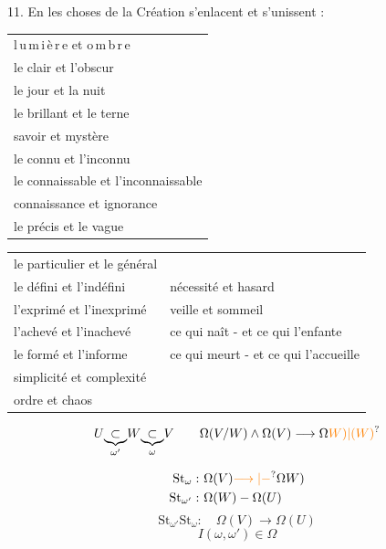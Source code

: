 11. En les choses de la Création s'enlacent et s'unissent :

\begin{tabular}{@{}l@{}}
l\,u\,m\,i\,è\,r\,e \quad et \quad o\,m\,b\,r\,e\\
le clair \quad et l'obscur\\
le jour \quad et la nuit\\
le brillant \quad et le terne\\[.6ex]
savoir \quad et mystère\\
le connu \quad et l'inconnu\\
le connaissable \quad et l'inconnaissable\\
connaissance \quad et ignorance\\[.6ex]
le précis \quad et le vague
\end{tabular}

\begin{tabular}{@{}p{.48\linewidth}@{\quad}p{.43\linewidth}@{}}
le particulier \quad et le général & \\
le défini \quad et l'indéfini & \makebox[0pt][r]{\smash{\begin{tikzpicture}[x=1em,y=1ex,baseline=0pt]\draw (-1.0,-11)--(.45,2.1);\end{tikzpicture}}\hspace{.35em}}nécessité \quad et hasard\\
l'exprimé \quad et l'inexprimé & veille \quad et sommeil\\[.6ex]
l'achevé \quad et l'inachevé & ce qui naît - et ce qui l'enfante\\
le formé \quad et l'informe & ce qui meurt - et ce qui l'accueille\\
simplicité \quad et complexité &\\
ordre \quad et chaos &
\end{tabular}

\[
U\underset{\omega'}{\underbrace{\subset}}W\underset{\omega}{\underbrace{\subset}}V
\qquad
\Omega(V/W)\wedge\Omega(V)\longrightarrow\Omega\unsure{W)|(W)}
\]

\[
\begin{aligned}
\mathrm{St}_{\omega}:&\ \Omega(V)\unsure{\longrightarrow|-}\Omega W)\\
\mathrm{St}_{\omega'}:&\ \Omega(W)-\Omega(U)
\end{aligned}
\]
\[
\mathrm{St}_{\omega'}\mathrm{St}_{\omega}:\quad \Omega(V)\longrightarrow\Omega(U)
\]
\[
I(\omega,\omega')\in\Omega
\]

